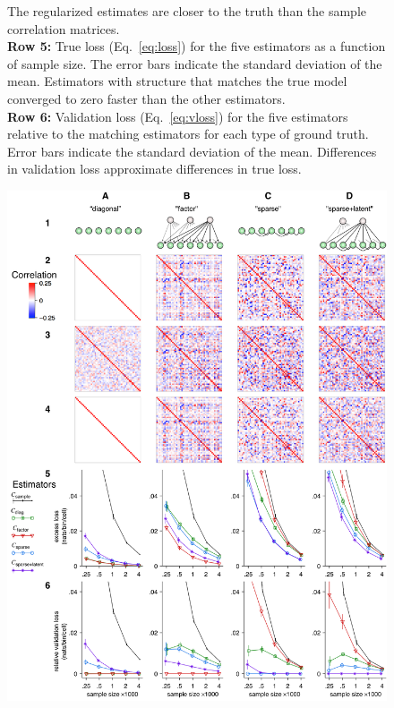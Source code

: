 \begin{figure}
\begin{leftfullpage}
{The regularized estimates are closer to the truth than the sample correlation matrices.
     \\
{\bf Row 5:} True loss (Eq.~\ref{eq:loss}) for the five estimators as a function of sample size. The error bars indicate the standard deviation of the mean.  Estimators with structure that matches the true model converged to zero faster than the other estimators.
     \\
{\bf Row 6:} Validation loss (Eq.~\ref{eq:vloss}) for the five estimators relative to the matching estimators for each type of ground truth. Error bars indicate the standard deviation of the mean.  Differences in validation loss approximate differences in true loss.
}\label{fig:1}
\end{leftfullpage}
\end{figure}

\begin{figure}
\begin{fullpage}
        \includegraphics[width=\textwidth]{./figures/Figure1.png}
\end{fullpage}
\end{figure}
